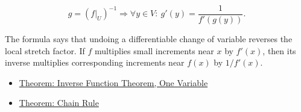 \begin{remark*}
\[
  g=(f|_U)^{-1}
  \Longrightarrow
  \forall y\in V:\ g'(y)=\frac{1}{f'(g(y))}.
\]
\end{remark*}

\begin{remark*}[Interpretation]
The formula says that undoing a differentiable change of variable reverses the local stretch factor. If \(f\) multiplies small increments near \(x\) by \(f'(x)\), then its inverse multiplies corresponding increments near \(f(x)\) by \(1/f'(x)\).
\end{remark*}

\begin{dependencies}
\begin{itemize}
  \item \hyperref[thm:inverse-function-theorem-one-variable]{Theorem: Inverse Function Theorem, One Variable}
  \item \hyperref[thm:chain-rule]{Theorem: Chain Rule}
\end{itemize}
\end{dependencies}
